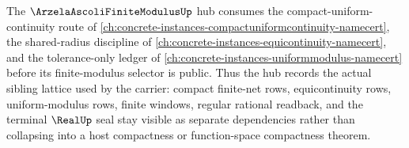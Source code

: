 The $\ArzelaAscoliFiniteModulusUp$ hub consumes the compact-uniform-continuity route of \autoref{ch:concrete-instances-compactuniformcontinuity-namecert}, the shared-radius discipline of \autoref{ch:concrete-instances-equicontinuity-namecert}, and the tolerance-only ledger of \autoref{ch:concrete-instances-uniformmodulus-namecert} before its finite-modulus selector is public. Thus the hub records the actual sibling lattice used by the carrier: compact finite-net rows, equicontinuity rows, uniform-modulus rows, finite windows, regular rational readback, and the terminal $\RealUp$ seal stay visible as separate dependencies rather than collapsing into a host compactness or function-space compactness theorem.
